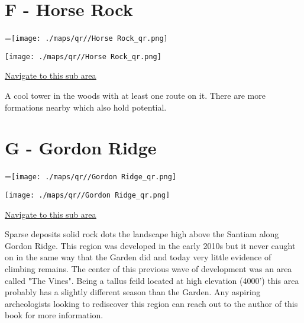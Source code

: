 \begin{multicols}{2}
\section{F - Horse Rock}\label{sa:Horse Rock}
=\hbox{\texttt{[image: ./maps/qr//Horse Rock\_qr.png]}}%
\begin{center}
\texttt{[image: ./maps/qr//Horse Rock\_qr.png]}
\end{center}
\begin{center}
\underline{\textcolor{blue}{\href{http://maps.google.com/maps?q=44.31343,-122.33943}{Navigate to this sub area}}}
\end{center}


A cool tower in the woods with at least one route on it. There are more formations nearby which also hold potential.\\




\vfill\null
\columnbreak

\section{G - Gordon Ridge}\label{sa:Gordon Ridge}
=\hbox{\texttt{[image: ./maps/qr//Gordon Ridge\_qr.png]}}%
\begin{center}
\texttt{[image: ./maps/qr//Gordon Ridge\_qr.png]}
\end{center}
\begin{center}
\underline{\textcolor{blue}{\href{http://maps.google.com/maps?q=44.34844,-122.34942}{Navigate to this sub area}}}
\end{center}


Sparse deposits solid rock dots the landscape high above the Santiam along Gordon Ridge. This region was developed in the early 2010s but it never caught on in the same way that the Garden did and today very little evidence of climbing remains. The center of this previous wave of development was an area called "The Vines". Being a tallus feild located at high elevation (4000') this area probably has a slightly different season than the Garden. Any aspiring archeologists looking to rediscover this region can reach out to the author of this book for more information.\\





\end{multicols}

